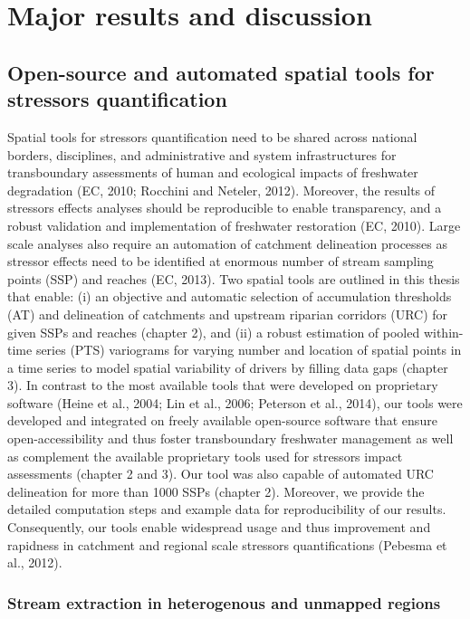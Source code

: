 \chapter{Major results and discussion}
\label{chapter6}

\section{Open-source and automated spatial tools for stressors quantification}
\label{Open-source and automated spatial tools for stressors quantification}

Spatial tools for stressors quantification need to be shared across national borders, disciplines, and administrative and system infrastructures for transboundary assessments of human and ecological impacts of freshwater degradation (EC, 2010; Rocchini and Neteler, 2012). Moreover, the results of stressors effects analyses should be reproducible to enable transparency, and a robust validation and implementation of freshwater restoration (EC, 2010). Large scale analyses also require an automation of catchment delineation processes as stressor effects need to be identified at enormous number of stream sampling points (SSP) and reaches (EC, 2013). Two spatial tools are outlined in this thesis that enable: (i) an objective and automatic selection of accumulation thresholds (AT) and delineation of catchments and upstream riparian corridors (URC) for given SSPs and reaches (chapter 2), and (ii) a robust estimation of pooled within-time series (PTS) variograms for varying number and location of spatial points in a time series to model spatial variability of drivers by filling data gaps (chapter 3). In contrast to the most available tools that were developed on proprietary software (Heine et al., 2004; Lin et al., 2006; Peterson et al., 2014), our tools were developed and integrated on freely available open-source software that ensure open-accessibility and thus foster transboundary freshwater management as well as complement the available proprietary tools used for stressors impact assessments (chapter 2 and 3). Our tool was also capable of automated URC delineation for more than 1000 SSPs (chapter 2). Moreover, we provide the detailed computation steps and example data for reproducibility of our results. Consequently, our tools enable widespread usage and thus improvement and rapidness in catchment and regional scale stressors quantifications (Pebesma et al., 2012).


\subsection{Stream extraction in heterogenous and unmapped regions}
\label{Stream extraction in heterogenous and unmapped regions}

